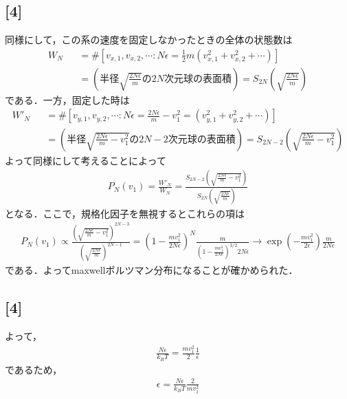 \documentclass[12pt,dvipdfmx]{jsarticle}
\begin{document}
\subsection*{\large{[4]}}
同様にして，この系の速度を固定しなかったときの全体の状態数は
\begin{eqnarray}
  W_{N} &&= \# \left[ v_{x,1},v_{x,2},\cdots: N\epsilon = \frac{1}{2}m \left( v_{x,1}^2 +v_{x,2}^2 + \cdots  \right) \right] \\
  &&= \left( 半径 \sqrt{\frac{2N\epsilon}{m}}の2N次元球の表面積 \right) = S_{2N}\left( \sqrt{\frac{2N\epsilon}{m}} \right)
\end{eqnarray}
である．一方，固定した時は
\begin{eqnarray}
  W'_{N} &&= \# \left[ v_{y,1},v_{y,2},\cdots: N\epsilon = \frac{2N\epsilon}{m}-v_1^2= \left( v_{y,1}^2 +v_{y,2}^2 + \cdots  \right) \right] \\
  &&= \left( 半径 \sqrt{\frac{2N\epsilon}{m}-v_1^2}の2N-2次元球の表面積 \right) = S_{2N-2}\left( \sqrt{\frac{2N\epsilon}{m}-v_1^2} \right)
\end{eqnarray}
よって同様にして考えることによって
\begin{eqnarray}
  P_N(v_1) = \frac{W'_{N}}{W_{N}}= \frac{S_{2N-2}\left( \sqrt{\frac{2N\epsilon}{m}-v_1^2} \right)}{S_{2N}\left( \sqrt{\frac{2N\epsilon}{m}} \right)}
\end{eqnarray}
となる．ここで，規格化因子を無視するとこれらの項は
\begin{eqnarray}
  P_N(v_1) \propto \frac{\left( \sqrt{\frac{2N\epsilon}{m}-v_1^2} \right)^{2N-3}}{\left( \sqrt{\frac{2N\epsilon}{m}} \right)^{2N-1}} = \left( 1- \frac{mv_1^2}{2N\epsilon} \right)^N \frac{m}{\left( 1-\frac{mv_1^2}{2N\epsilon} \right)^{3/2}2N\epsilon}\to \exp\left( -\frac{mv_1^2}{2\epsilon} \right)\frac{m}{2N\epsilon}
\end{eqnarray} 
である．よってmaxwellボルツマン分布になることが確かめられた．
\subsection*{\large{[4]}}
よって，
\begin{eqnarray}
  \frac{N\epsilon}{k_B T} = \frac{mv_1^2}{2}\frac{1}{\epsilon}
\end{eqnarray}
であるため，
\begin{eqnarray}
  \epsilon = \frac{N\epsilon}{k_B T} \frac{2}{mv_1^2}
\end{eqnarray}
\end{document}

